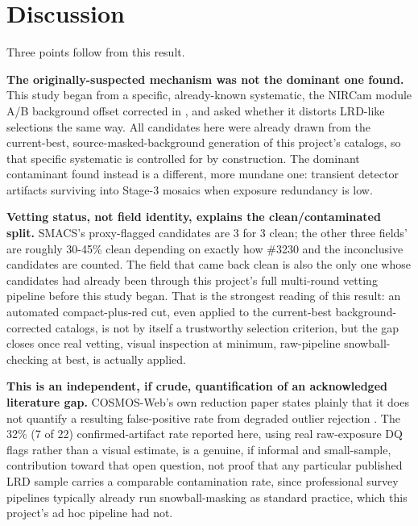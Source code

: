 \documentclass[11pt]{article}
\begin{document}
\section{Discussion}

Three points follow from this result.

\textbf{The originally-suspected mechanism was not the dominant one found.} This
study began from a specific, already-known systematic, the NIRCam module A/B
background offset corrected in \cite{Jarvis2026a}, and asked whether it distorts
LRD-like selections the same way. All candidates here were already drawn from the
current-best, source-masked-background generation of this project's catalogs, so
that specific systematic is controlled for by construction. The dominant
contaminant found instead is a different, more mundane one: transient detector
artifacts surviving into Stage-3 mosaics when exposure redundancy is low.

\textbf{Vetting status, not field identity, explains the clean/contaminated
split.} SMACS's proxy-flagged candidates are 3 for 3 clean; the other three
fields' are roughly 30-45\% clean depending on exactly how \#3230 and the
inconclusive candidates are counted. The field that came back clean is also the
only one whose candidates had already been through this project's full
multi-round vetting pipeline before this study began. That is the strongest
reading of this result: an automated compact-plus-red cut, even applied to the
current-best background-corrected catalogs, is not by itself a trustworthy
selection criterion, but the gap closes once real vetting, visual inspection at
minimum, raw-pipeline snowball-checking at best, is actually applied.

\textbf{This is an independent, if crude, quantification of an acknowledged
literature gap.} COSMOS-Web's own reduction paper states plainly that it does not
quantify a resulting false-positive rate from degraded outlier rejection
\cite{Franco2025}. The 32\% (7 of 22) confirmed-artifact rate reported here, using
real raw-exposure DQ flags rather than a visual estimate, is a genuine, if
informal and small-sample, contribution toward that open question, not proof
that any particular published LRD sample carries a comparable contamination rate,
since professional survey pipelines typically already run snowball-masking as
standard practice, which this project's ad hoc pipeline had not.
\end{document}
